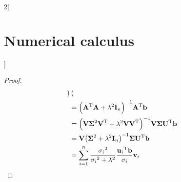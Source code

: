 \documentclass[../../../main_math.tex]{subfiles}
\begin{document}
\begin{multicols}{2}[\section{Numerical calculus}]
\begin{proof}
\begin{align*}
\begin{pmatrix}
                                                                                                           \end{pmatrix}                                      \\
                     & = {\left( {\boldsymbol{\mathrm{A}}}^{\mathrm{T}}\boldsymbol{\mathrm{A}}+\lambda^2\boldsymbol{\mathrm{I}}_n\right)}^{-1}{\boldsymbol{\mathrm{A}}}^{\mathrm{T}}\boldsymbol{\mathrm{b}}                                               \\
                     & ={\left( \boldsymbol{\mathrm{V}}{\boldsymbol{\mathrm{\Sigma}}}^2{\boldsymbol{\mathrm{V}}}^{\mathrm{T}}+\lambda^2\boldsymbol{\mathrm{V}}{\boldsymbol{\mathrm{V}}}^{\mathrm{T}}\right)}^{-1} \boldsymbol{\mathrm{V}}{\boldsymbol{\mathrm{\Sigma}}}{\boldsymbol{\mathrm{U}}}^{\mathrm{T}}\boldsymbol{\mathrm{b}} \\
                     & =\boldsymbol{\mathrm{V}}{\left({\boldsymbol{\mathrm{\Sigma}}}^2+\lambda^2\boldsymbol{\mathrm{I}}_n\right)}^{-1} \boldsymbol{\mathrm{\Sigma}}{\boldsymbol{\mathrm{U}}}^{\mathrm{T}}\boldsymbol{\mathrm{b}}                                          \\
                     & =\sum_{i=1}^{n}\frac{{\sigma_i}^2}{{\sigma_i}^2+\lambda^2} \frac{{\boldsymbol{\mathrm{u}}_i}^{\mathrm{T}}\boldsymbol{\mathrm{b}}}{\sigma_i}\boldsymbol{\mathrm{v}}_i
    \end{align*}
  \end{proof}

\end{multicols}
\end{document}
